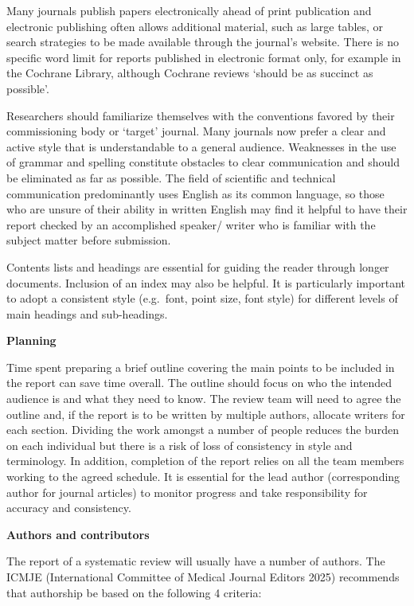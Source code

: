 \documentclass[
  11pt,
  a4paper,
  DIV=11,
  numbers=noendperiod]{scrreprt}
\begin{document}
Many journals publish papers electronically ahead of print publication
and electronic publishing often allows additional material, such as
large tables, or search strategies to be made available through the
journal's website. There is no specific word limit for reports published
in electronic format only, for example in the Cochrane Library, although
Cochrane reviews `should be as succinct as possible'.

Researchers should familiarize themselves with the conventions favored
by their commissioning body or `target' journal. Many journals now
prefer a clear and active style that is understandable to a general
audience. Weaknesses in the use of grammar and spelling constitute
obstacles to clear communication and should be eliminated as far as
possible. The field of scientific and technical communication
predominantly uses English as its common language, so those who are
unsure of their ability in written English may find it helpful to have
their report checked by an accomplished speaker/ writer who is familiar
with the subject matter before submission.

Contents lists and headings are essential for guiding the reader through
longer documents. Inclusion of an index may also be helpful. It is
particularly important to adopt a consistent style (e.g.~font, point
size, font style) for different levels of main headings and
sub-headings.

\textbf{Planning}

Time spent preparing a brief outline covering the main points to be
included in the report can save time overall. The outline should focus
on who the intended audience is and what they need to know. The review
team will need to agree the outline and, if the report is to be written
by multiple authors, allocate writers for each section. Dividing the
work amongst a number of people reduces the burden on each individual
but there is a risk of loss of consistency in style and terminology. In
addition, completion of the report relies on all the team members
working to the agreed schedule. It is essential for the lead author
(corresponding author for journal articles) to monitor progress and take
responsibility for accuracy and consistency.

\textbf{Authors and contributors}

The report of a systematic review will usually have a number of authors.
The ICMJE (International Committee of Medical Journal Editors 2025)
recommends that authorship be based on the following 4 criteria:
\end{document}
